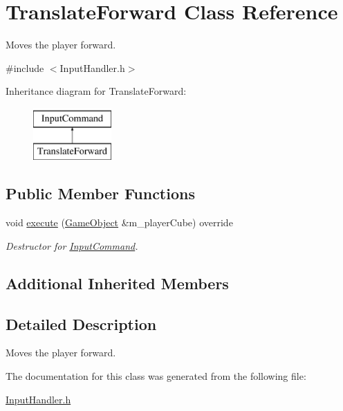 \hypertarget{class_translate_forward}{}\section{Translate\+Forward Class Reference}
\label{class_translate_forward}


Moves the player forward.  




{\ttfamily \#include $<$Input\+Handler.\+h$>$}

Inheritance diagram for Translate\+Forward\+:\begin{figure}[H]
\begin{center}
\leavevmode
\includegraphics[height=2.000000cm]{class_translate_forward}
\end{center}
\end{figure}
\subsection*{Public Member Functions}
\begin{DoxyCompactItemize}
\item 
\mbox{\label{class_translate_forward_a1abffe54a8afcd3aa0e711dffc7d8ddb}} 
void \mbox{\hyperlink{class_translate_forward_a1abffe54a8afcd3aa0e711dffc7d8ddb}{execute}} (\mbox{\hyperlink{class_game_object}{Game\+Object}} \&m\+\_\+player\+Cube) override
\begin{DoxyCompactList}\small\item\em Destructor for \mbox{\hyperlink{class_input_command}{Input\+Command}}. \end{DoxyCompactList}\end{DoxyCompactItemize}
\subsection*{Additional Inherited Members}


\subsection{Detailed Description}
Moves the player forward. 

The documentation for this class was generated from the following file\+:\begin{DoxyCompactItemize}
\item 
\mbox{\hyperlink{_input_handler_8h}{Input\+Handler.\+h}}\end{DoxyCompactItemize}
